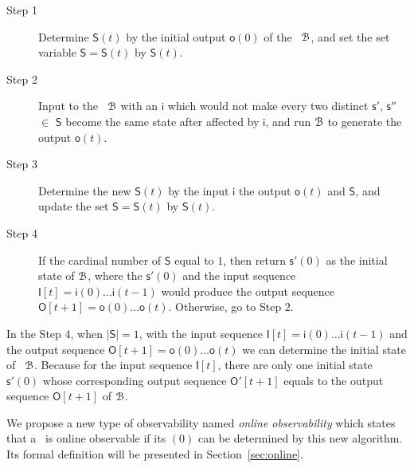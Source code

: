  
\begin{description}
	\item[Step 1]  Determine $\mathsf{S}(t)$ by the initial output $\mathsf{o}(0)$ of the \BCN\ ${\mathcal{B}}$, and set the set variable $\mathsf{S}=\mathsf{S}(t)$ by $\mathsf{S}(t)$.
	\item[Step 2] Input to the \BCN\ ${\mathcal{B}}$ with an $\mathsf{i}$ which would not make every two distinct $\mathsf{s}'$, $\mathsf{s}''$$\in$ $\mathsf{S}$ become the same state after affected by $\mathsf{i}$, and run ${\mathcal{B}}$ to generate the output $\mathsf{o}(t)$. 
	\item[Step 3] Determine the new $\mathsf{S}(t)$ by the input $\mathsf{i}$ the output $\mathsf{o}(t)$ and $\mathsf{S}$, and update the set $\mathsf{S}=\mathsf{S}(t)$ by $\mathsf{S}(t)$.
	\item[Step 4] If the cardinal number of $\mathsf{S}$ equal to $1$, then return $\mathsf{s}'(0)$ as the initial state of ${\mathcal{B}}$, where the $\mathsf{s}'(0)$ and the input sequence $\mathsf{I}[t]=\mathsf{i}(0)\ldots\mathsf{i}(t-1)$ would produce the output sequence $\mathsf{O}[t+1]=\mathsf{o}(0)\ldots\mathsf{o}(t)$. Otherwise, go to Step 2.
\end{description}



In the Step 4, when $|\mathsf{S}|=1$, with the input sequence $\mathsf{I}[t]=\mathsf{i}(0)\ldots\mathsf{i}(t-1)$ and the output sequence $\mathsf{O}[t+1]=\mathsf{o}(0)\ldots\mathsf{o}(t)$ we can determine the initial state of \BCN\ ${\mathcal{B}}$. Because for the input sequence $\mathsf{I}[t]$, there are only one initial state $\mathsf{s}'(0)$ whose corresponding output sequence  $\mathsf{O}'[t+1]$ equals to the output sequence $\mathsf{O}[t+1]$ of ${\mathcal{B}}$.

We propose a new type of observability named {\em online observability} which states that a \BCN\ is online observable if its \State$(0)$ can be determined by this new algorithm. Its formal definition will be presented in Section~\ref{sec:online}.  

